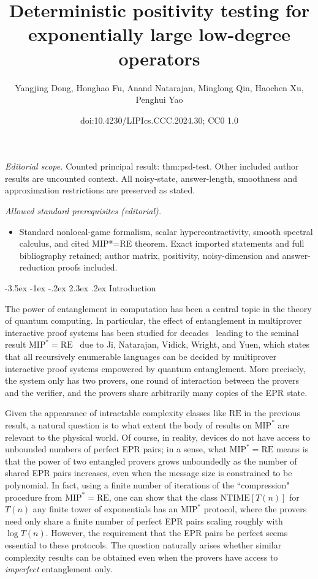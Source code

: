 \documentclass[10pt,a4paper]{article}
\title{Deterministic positivity testing for exponentially large low-degree operators}
\author{Yangjing Dong, Honghao Fu, Anand Natarajan, Minglong Qin, Haochen Xu, Penghui Yao}
\date{doi:10.4230/LIPIcs.CCC.2024.30; CC0 1.0}
\makeatletter
\renewcommand{\section}{\@startsection {section}{1}{\z@}%
             {-3.5ex \@plus -1ex \@minus -.2ex}%
             {2.3ex \@plus .2ex}%
             {\normalfont\Large\scshape\bfseries}}
\theoremstyle{plain}
\theoremstyle{definition}
\newcommand{\1}{\mathbb{1}} %
\newcommand{\MIP}{\mathrm{MIP}}
\newcommand{\RE}{\mathrm{RE}}
\makeatother
\begin{document}
\maketitle
\noindent\textit{Editorial scope.} Counted principal result: thm:psd-test. Other included author results are uncounted context. All noisy-state, answer-length, smoothness and approximation restrictions are preserved as stated.\par\medskip
\noindent\textit{Allowed standard prerequisites (editorial).}\begin{itemize}
\item Standard nonlocal-game formalism, scalar hypercontractivity, smooth spectral calculus, and cited MIP*=RE theorem. Exact imported statements and full bibliography retained; author matrix, positivity, noisy-dimension and answer-reduction proofs included.
\end{itemize}\medskip
 \section{Introduction}

The power of entanglement in computation has been a central topic in the theory of quantum computing. In particular, the effect of entanglement in multiprover interactive proof systems has been studied for decades~\cite{doi:10.1137/090772885,doi:10.1137/090751293,Ito:2009:OTO:1602931.1603187,Ji:2017:CQM:3055399.3055441,Slo:2020,slofstra:2019}  leading to the seminal result $\mathrm{MIP}^*=\mathrm{RE}$~\cite{JNVWYuen'20,JNVWY'20} due to Ji, Natarajan, Vidick, Wright, and Yuen, which states that all recursively enumerable languages can be decided by multiprover interactive proof systems empowered by quantum entanglement. More precisely, the system only has two provers, one round of interaction between the provers and the verifier, and the provers share arbitrarily many copies of the EPR state.



Given the appearance of intractable complexity classes like $\RE$ in the previous result, a natural question is to what extent the body of results on $\MIP^*$ are relevant to the physical world. Of course, in reality, devices do not have access to unbounded numbers of perfect EPR pairs; in a sense, what $\MIP^* = \RE$ means is that the power of two entangled provers grows unboundedly as the number of shared EPR pairs increases, even when the message size is constrained to be polynomial. In fact, using a finite number of iterations of the ``compression" procedure from $\MIP^* = \RE$, one can show that the class $\mathrm{NTIME}[T(n)]$ for $T(n)$ any finite tower of exponentials has an $\MIP^*$ protocol, where the provers need only share a finite number of perfect EPR pairs scaling roughly with $\log T(n)$. However, the requirement that the EPR pairs be perfect seems essential to these protocols. The question naturally arises whether similar complexity results can be obtained even when the provers have access to \emph{imperfect} entanglement only.
\end{document}
